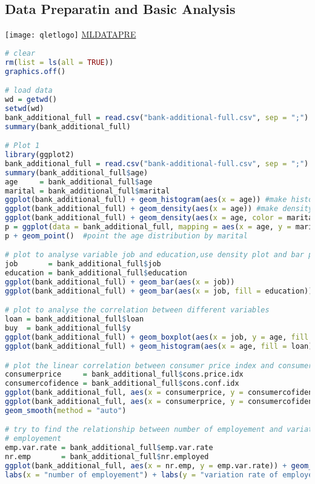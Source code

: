 \documentclass[12pt, a4paper, bibliography=totoc, english]{scrartcl}
\begin{document}
\subsection{Data Preparatin and Basic Analysis}
\texttt{[image: qletlogo]}
\textcolor{blue}{\href{https://github.com/JingyiLiu3136/MLFBM/blob/master/MLDATAPRE/SPL_MLDATAPRE.R}{MLDATAPRE}}
\begin{lstlisting}[language = R]
# clear
rm(list = ls(all = TRUE))
graphics.off()

# load data
wd = getwd()
setwd(wd)
bank_additional_full = read.csv("bank-additional-full.csv", sep = ";")
summary(bank_additional_full)

# Plot 1
library(ggplot2)
bank_additional_full = read.csv("bank-additional-full.csv", sep = ";")
summary(bank_additional_full$age)
age     = bank_additional_full$age
marital = bank_additional_full$marital
ggplot(bank_additional_full) + geom_histogram(aes(x = age)) #make histogram of age distribution
ggplot(bank_additional_full) + geom_density(aes(x = age)) #make density of age distribution
ggplot(bank_additional_full) + geom_density(aes(x = age, color = marital))
p = ggplot(data = bank_additional_full, mapping = aes(x = age, y = marital))
p + geom_point()  #point the age distribution by marital

# plot to analyse variable job and education,use density plot and bar plot
job       = bank_additional_full$job
education = bank_additional_full$education
ggplot(bank_additional_full) + geom_bar(aes(x = job))
ggplot(bank_additional_full) + geom_bar(aes(x = job, fill = education))

# plot to analyse the correlation between different variables
loan = bank_additional_full$loan
buy  = bank_additional_full$y
ggplot(bank_additional_full) + geom_boxplot(aes(x = job, y = age, fill = buy))
ggplot(bank_additional_full) + geom_histogram(aes(x = age, fill = loan))

# plot the linear correlation between consumer price index and consumer confidence
consumerprice     = bank_additional_full$cons.price.idx
consumercofidence = bank_additional_full$cons.conf.idx
ggplot(bank_additional_full, aes(x = consumerprice, y = consumercofidence)) + geom_point()
ggplot(bank_additional_full, aes(x = consumerprice, y = consumercofidence)) + geom_point() + 
geom_smooth(method = "auto")

# try to find the relationship between number of employement and variation rate of
# employement
emp.var.rate = bank_additional_full$emp.var.rate
nr.emp       = bank_additional_full$nr.employed
ggplot(bank_additional_full, aes(x = nr.emp, y = emp.var.rate)) + geom_point() + geom_smooth(method = 'auto') + 
labs(x = "number of employement") + labs(y = "variation rate of employement")


\end{lstlisting}
\end{document}
